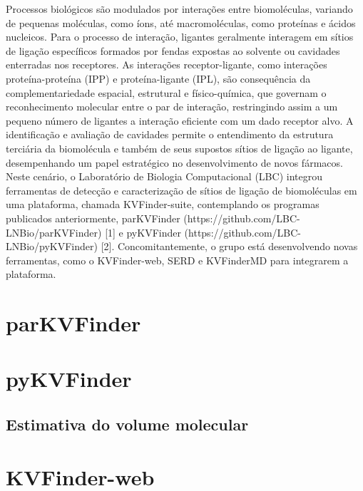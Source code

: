 \documentclass[Portugues]{phdquali}
\begin{document}
Processos biológicos são modulados por interações entre biomoléculas, variando de pequenas moléculas, como íons, até macromoléculas, como proteínas e ácidos nucleicos. Para o processo de interação, ligantes geralmente interagem em sítios de ligação específicos formados por fendas expostas ao solvente ou cavidades enterradas nos receptores. As interações receptor-ligante, como interações proteína-proteína (IPP) e proteína-ligante (IPL), são consequência da complementariedade espacial, estrutural e físico-química, que governam o reconhecimento molecular entre o par de interação, restringindo assim a um pequeno número de ligantes a interação eficiente com um dado receptor alvo. A identificação e avaliação de cavidades permite o entendimento da estrutura terciária da biomolécula e também de seus supostos sítios de ligação ao ligante, desempenhando um papel estratégico no desenvolvimento de novos fármacos. Neste cenário, o Laboratório de Biologia Computacional (LBC) integrou ferramentas de detecção e caracterização de sítios de ligação de biomoléculas em uma plataforma, chamada KVFinder-suite, contemplando os programas publicados anteriormente, parKVFinder (https://github.com/LBC-LNBio/parKVFinder) [1] e pyKVFinder (https://github.com/LBC-LNBio/pyKVFinder) [2]. Concomitantemente, o grupo está desenvolvendo novas ferramentas, como o KVFinder-web, SERD e KVFinderMD para integrarem a plataforma. 

\section{parKVFinder}

\section{pyKVFinder}

\subsection{Estimativa do volume molecular}

\cite{guerra2023B}

\section{KVFinder-web}

\end{document}
